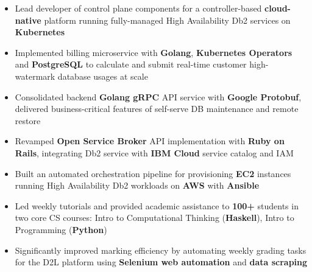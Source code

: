 \documentclass[10pt,a4paper]{altacv}
\begin{document}
 \begin{itemize} 
  \item Lead developer of control plane components for a controller-based \textbf{cloud-native} platform running fully-managed High Availability Db2 services on \textbf{Kubernetes}

  \item Implemented billing microservice with \textbf{Golang}, \textbf{Kubernetes Operators} and \textbf{PostgreSQL} to calculate and submit real-time  customer high-watermark database usages at scale
  \item Consolidated backend \textbf{Golang gRPC} API service with \textbf{Google Protobuf}, delivered business-critical features of self-serve DB maintenance and remote restore \\
\item Revamped \textbf{Open Service Broker} API implementation with \textbf{Ruby on Rails}, integrating Db2 service with \textbf{IBM Cloud} service catalog and IAM
 \item Built an automated orchestration pipeline for provisioning \textbf{EC2} instances running High Availability Db2 workloads on \textbf{AWS} with \textbf{Ansible} \\
  
 \end{itemize}
 
 \divider
 
 \begin{itemize} 
 \item Led weekly tutorials and provided academic assistance to \textbf{100+} students in two core CS courses: Intro to Computational Thinking (\textbf{Haskell}), Intro to Programming (\textbf{Python})
 \item Significantly improved marking efficiency by automating weekly grading tasks for the D2L platform using 
\textbf{Selenium web automation} and \textbf{data scraping}
 
 
 \end{itemize}
\divider
\end{document}

